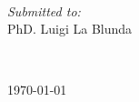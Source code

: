 \begin{titlepage}
\begin{minipage}{0.5\textwidth}
\begin{flushleft}
\end{flushleft}
\end{minipage}
~
\begin{minipage}{0.4\textwidth}
\begin{flushright} \large
\emph{Submitted to:} \\
PhD. Luigi La Blunda \\[1.2em] 
\end{flushright}
\end{minipage}\\[2cm]
\makeatother


{\large \today}\\[2cm] %

\vfill %

\end{titlepage}
